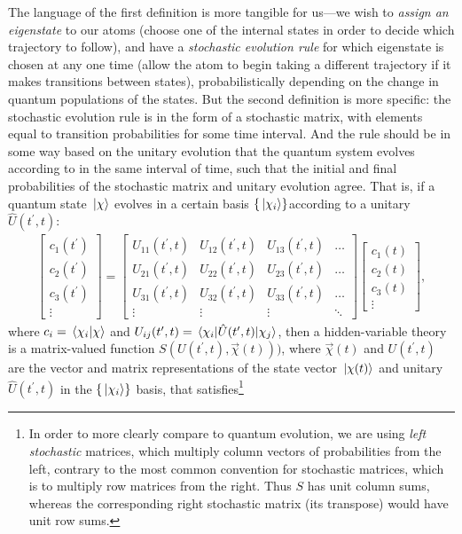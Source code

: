 The language of the first definition is more tangible for us---we wish to \emph{assign an eigenstate} to our atoms (choose one of the internal states in order to decide which trajectory to follow), and have a \emph{stochastic evolution rule} for which eigenstate is chosen at any one time (allow the atom to begin taking a different trajectory if it makes transitions between states), probabilistically depending on the change in quantum populations of the states. But the second definition is more specific: the stochastic evolution rule is in the form of a stochastic matrix, with elements equal to transition probabilities for some time interval. And the rule should be in some way based on the unitary evolution that the quantum system evolves according to in the same interval of time, such that the initial and final probabilities of the stochastic matrix and unitary evolution agree. That is, if a quantum state $\ket\chi$ evolves in a certain basis $\{\ket{\chi_i}\}$according to a unitary $\hat U(t^\prime, t)$:
\begin{align}
\left[\begin{matrix}
c_1(t^\prime)\\c_2(t^\prime)\\c_3(t^\prime)\\\vdots
\end{matrix}\right]
= \left[\begin{matrix}
U_{11}(t^\prime, t) & U_{12}(t^\prime, t) & U_{13}(t^\prime, t)&\hdots\\
U_{21}(t^\prime, t) & U_{22}(t^\prime, t) & U_{23}(t^\prime, t)&\hdots\\
U_{31}(t^\prime, t) & U_{32}(t^\prime, t) & U_{33}(t^\prime, t)&\hdots\\
\vdots & \vdots & \vdots & \ddots
\end{matrix}\right]
\left[\begin{matrix}
c_1(t)\\c_2(t)\\c_3(t)\\\vdots
\end{matrix}\right],
\end{align}
where $c_i = \braket{\chi_i}{\chi}$ and $U_{ij}(t^\prime, t) = \matrixel{\chi_i}{\hat U(t^\prime, t)}{\chi_j}$, then a hidden-variable theory is a matrix-valued function $S(U(t^\prime, t), \vec\chi(t)))$, where $\vec\chi(t)$ and $U(t^\prime, t)$ are the vector and matrix representations of the state vector $\ket{\chi(t)}$ and unitary $\hat U(t^\prime, t)$ in the $\{\ket{\chi_i}\}$ basis, that satisfies\footnote{In order to more clearly compare to quantum evolution, we are using \emph{left stochastic} matrices, which multiply column vectors of probabilities from the left, contrary to the most common convention for stochastic matrices, which is to multiply row matrices from the right. Thus $S$ has unit column sums, whereas the corresponding right stochastic matrix (its transpose) would have unit row sums.}
